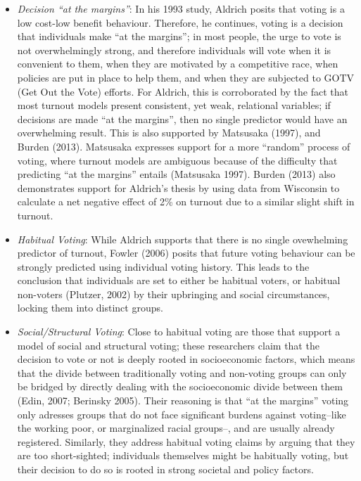 \documentclass[12pt,twoside]{reedthesis}
\begin{document}
  \begin{itemize}
  \item
    \emph{Decision ``at the margins''}: In his 1993 study, Aldrich posits
    that voting is a low cost-low benefit behaviour. Therefore, he
    continues, voting is a decision that individuals make ``at the
    margins''; in most people, the urge to vote is not overwhelmingly
    strong, and therefore individuals will vote when it is convenient to
    them, when they are motivated by a competitive race, when policies are
    put in place to help them, and when they are subjected to GOTV (Get
    Out the Vote) efforts. For Aldrich, this is corroborated by the fact
    that most turnout models present consistent, yet weak, relational
    variables; if decisions are made ``at the margins'', then no single
    predictor would have an overwhelming result. This is also supported by
    Matsusaka (1997), and Burden (2013). Matsusaka expresses support for a
    more ``random'' process of voting, where turnout models are ambiguous
    because of the difficulty that predicting ``at the margins'' entails
    (Matsusaka 1997). Burden (2013) also demonstrates support for
    Aldrich's thesis by using data from Wisconsin to calculate a net
    negative effect of 2\% on turnout due to a similar slight shift in
    turnout.
  \item
    \emph{Habitual Voting}: While Aldrich supports that there is no single
    ovewhelming predictor of turnout, Fowler (2006) posits that future
    voting behaviour can be strongly predicted using individual voting
    history. This leads to the conclusion that individuals are set to
    either be habitual voters, or habitual non-voters (Plutzer, 2002) by
    their upbringing and social circumstances, locking them into distinct
    groups.
  \item
    \emph{Social/Structural Voting}: Close to habitual voting are those
    that support a model of social and structural voting; these
    researchers claim that the decision to vote or not is deeply rooted in
    socioeconomic factors, which means that the divide between
    traditionally voting and non-voting groups can only be bridged by
    directly dealing with the socioeconomic divide between them (Edin,
    2007; Berinsky 2005). Their reasoning is that ``at the margins''
    voting only adresses groups that do not face significant burdens
    against voting--like the working poor, or marginalized racial
    groups--, and are usually already registered. Similarly, they address
    habitual voting claims by arguing that they are too short-sighted;
    individuals themselves might be habitually voting, but their decision
    to do so is rooted in strong societal and policy factors.
  \end{itemize}
  
\end{document}
